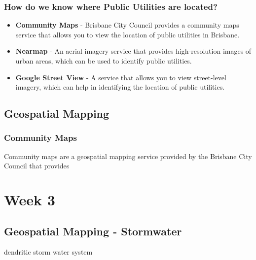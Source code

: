 \documentclass{report}
\begin{document}
	\newpage
	\subsection{How do we know where Public Utilities are located?}

	\begin{itemize}
		\item \textbf{Community Maps} - Brisbane City Council provides a community maps service that allows you to view the location of public utilities in Brisbane.
		\item \textbf{Nearmap} - An aerial imagery service that provides high-resolution images of urban areas, which can be used to identify public utilities.
		\item \textbf{Google Street View} - A service that allows you to view street-level imagery, which can help in identifying the location of public utilities.
	\end{itemize}

	
	\section{Geospatial Mapping}


	\subsection{Community Maps}
	Community maps are a geospatial mapping service provided by the Brisbane City Council that provides


	\chapter{Week 3}

	\section{Geospatial Mapping - Stormwater}

	dendritic storm water system
\end{document}
